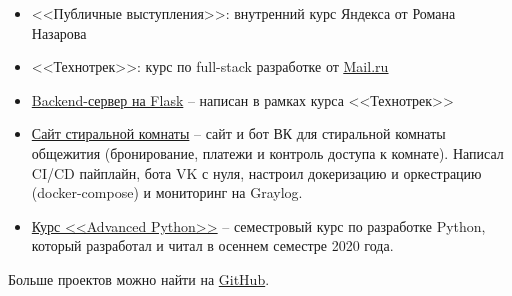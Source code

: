 
\begin{itemize}
    \item <<Публичные выступления>>: внутренний курс Яндекса от Романа Назарова
	\item <<Технотрек>>: курс по full-stack разработке от \href{https://track.mail.ru/}{\underline{Mail.ru}}
\end{itemize}


\begin{itemize}
    \item \href{https://github.com/alekseik1/tt-ridesharing-backend}{Backend-сервер на Flask} -- написан в рамках курса <<Технотрек>>
    \item \href{https://github.com/alekseik1/drec_stud_site}{Сайт стиральной комнаты} -- сайт и бот ВК для стиральной комнаты общежития (бронирование, платежи и контроль доступа к комнате). Написал CI/CD пайплайн, бота VK с нуля, настроил докеризацию и оркестрацию (docker-compose) и мониторинг на Graylog.
    \item \href{https://github.com/alekseik1/advanced_python_1sem_2020}{Курс <<Advanced Python>>} -- семестровый курс по разработке Python, который разработал и читал в осеннем семестре 2020 года.
\end{itemize}
Больше проектов можно найти на \href{https://github.com/alekseik1/}{GitHub}.

